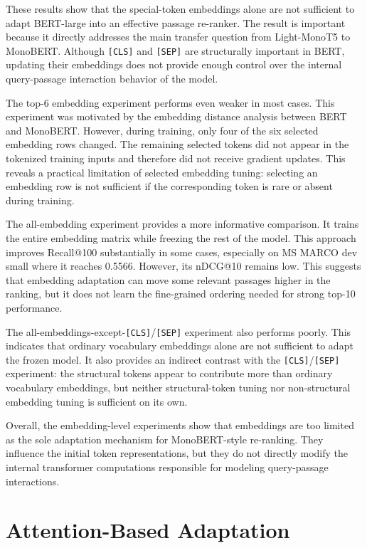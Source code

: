These results show that the special-token embeddings alone are not sufficient to adapt BERT-large into an effective passage re-ranker. The result is important because it directly addresses the main transfer question from Light-MonoT5 to MonoBERT. Although \texttt{[CLS]} and \texttt{[SEP]} are structurally important in BERT, updating their embeddings does not provide enough control over the internal query-passage interaction behavior of the model.

The top-6 embedding experiment performs even weaker in most cases. This experiment was motivated by the embedding distance analysis between BERT and MonoBERT. However, during training, only four of the six selected embedding rows changed. The remaining selected tokens did not appear in the tokenized training inputs and therefore did not receive gradient updates. This reveals a practical limitation of selected embedding tuning: selecting an embedding row is not sufficient if the corresponding token is rare or absent during training.

The all-embedding experiment provides a more informative comparison. It trains the entire embedding matrix while freezing the rest of the model. This approach improves Recall@100 substantially in some cases, especially on MS MARCO dev small where it reaches 0.5566. However, its nDCG@10 remains low. This suggests that embedding adaptation can move some relevant passages higher in the ranking, but it does not learn the fine-grained ordering needed for strong top-10 performance.

The all-embeddings-except-\texttt{[CLS]}/\texttt{[SEP]} experiment also performs poorly. This indicates that ordinary vocabulary embeddings alone are not sufficient to adapt the frozen model. It also provides an indirect contrast with the \texttt{[CLS]}/\texttt{[SEP]} experiment: the structural tokens appear to contribute more than ordinary vocabulary embeddings, but neither structural-token tuning nor non-structural embedding tuning is sufficient on its own.

Overall, the embedding-level experiments show that embeddings are too limited as the sole adaptation mechanism for MonoBERT-style re-ranking. They influence the initial token representations, but they do not directly modify the internal transformer computations responsible for modeling query-passage interactions.

\section{Attention-Based Adaptation}
\label{sec:results_attention}


